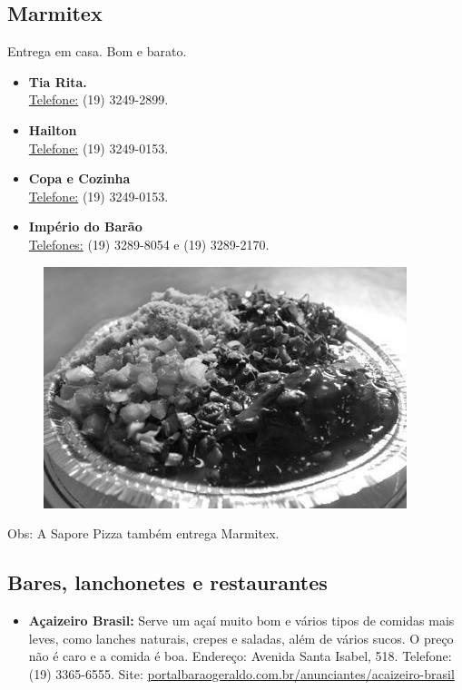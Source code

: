 \subsection{Marmitex}

Entrega em casa. Bom e barato.

\begin{itemize}
\item  \textbf{Tia Rita.}
\\\underline{Telefone:} (19) 3249-2899.
\end{itemize}

\begin{itemize}
\item  \textbf{Hailton}
\\\underline{Telefone:} (19) 3249-0153.
\end{itemize}

\begin{itemize}
\item  \textbf{Copa e Cozinha}
\\\underline{Telefone:} (19) 3249-0153.
\end{itemize}

\begin{itemize}
\item  \textbf{Império do Barão}
\\\underline{Telefones:} (19) 3289-8054 e (19) 3289-2170.
\end{itemize}

\begin{figure}[t!]
    \centering
    \includegraphics[scale=0.55,keepaspectratio=true]{img/imgs/6-comida/marmitex.jpg}
\end{figure}

Obs: A Sapore Pizza também entrega Marmitex.

\subsection{Bares, lanchonetes e restaurantes}
\begin{itemize}
\item  \textbf{Açaizeiro Brasil:} Serve um açaí muito bom e vários tipos de comidas mais leves, como lanches naturais, crepes e saladas, além de vários sucos. O preço não é caro e a comida é boa. Endereço: Avenida Santa Isabel, 518. Telefone: (19) 3365-6555. Site: \url{portalbaraogeraldo.com.br/anunciantes/acaizeiro-brasil}
\end{itemize}

